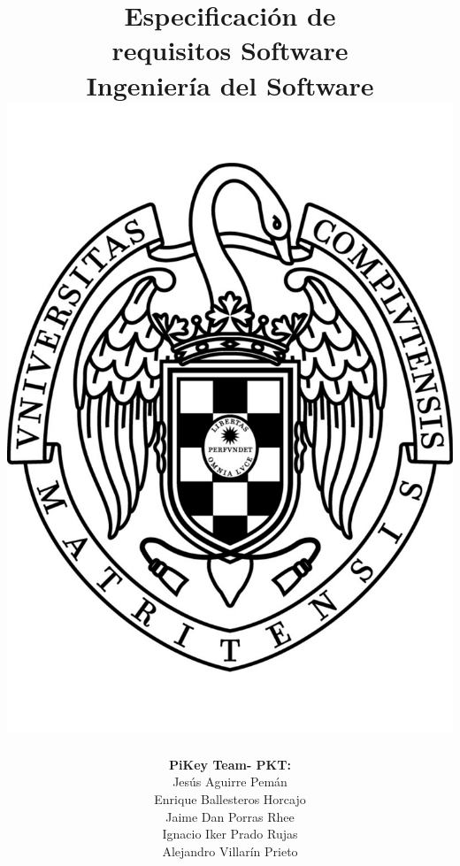 \documentclass[spanish,a4paper,11pt, twoside]{report}	%
\begin{document}
\title{\textbf{\huge{Especificación de \\ 
	requisitos Software}} \\ \vspace{0.3cm}
	\Large{Ingeniería del Software} \\
	\includegraphics[scale=0.3]{ucm.pdf}}
\author{ \textbf{\Large{PiKey Team- PKT:}} \vspace{0.2cm} \\
	Jesús Aguirre Pemán \\
	 Enrique Ballesteros Horcajo \\
	 Jaime Dan Porras Rhee \\
	 Ignacio Iker Prado Rujas \\
	 Alejandro Villarín Prieto }
\date{\Today}
\maketitle
\end{document}
